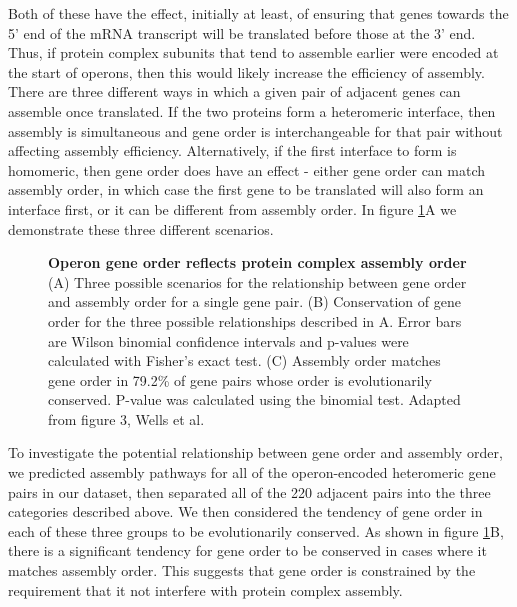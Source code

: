 \documentclass[a4paper,11pt,twoside,openright]{scrbook}
\begin{document}
Both of these have the effect, initially at least, of ensuring that genes
towards the 5' end of the mRNA transcript will be translated before those at the
3' end. Thus, if protein complex subunits that tend to assemble earlier were
encoded at the start of operons, then this would likely increase the efficiency
of assembly. There are three different ways in which a given pair of adjacent
genes can assemble once translated. If the two proteins form a heteromeric
interface, then assembly is simultaneous and gene order is interchangeable for
that pair without affecting assembly efficiency. Alternatively, if the first
interface to form is homomeric, then gene order does have an effect - either
gene order can match assembly order, in which case the first gene to be
translated will also form an interface first, or it can be different from
assembly order. In figure \ref{figure:operonassembly}A we demonstrate these
three different scenarios.

\begin{figure}[h]
    \caption[Operon gene order reflects protein complex assembly
    order]{\sffamily \textbf{Operon gene order reflects protein complex assembly
    order} \\ \small (A) Three possible scenarios for the relationship between
    gene order and assembly order for a single gene pair. (B) Conservation of
    gene order for the three possible relationships described in A. Error bars
    are Wilson binomial confidence intervals and p-values were calculated with
    Fisher's exact test. (C) Assembly order matches gene order in 79.2\% of gene
    pairs whose order is evolutionarily conserved. P-value was calculated using
    the binomial test. Adapted from figure 3, Wells et al. \cite{Wells2016}}
    \label{figure:operonassembly}
\end{figure}

To investigate the potential relationship between gene order and assembly order,
we predicted assembly pathways for all of the operon-encoded heteromeric gene
pairs in our dataset, then separated all of the 220 adjacent pairs into the
three categories described above. We then considered the tendency of gene order
in each of these three groups to be evolutionarily conserved. As shown in figure
\ref{figure:operonassembly}B, there is a significant tendency for gene order to
be conserved in cases where it matches assembly order. This suggests that gene
order is constrained by the requirement that it not interfere with protein
complex assembly.
\end{document}
